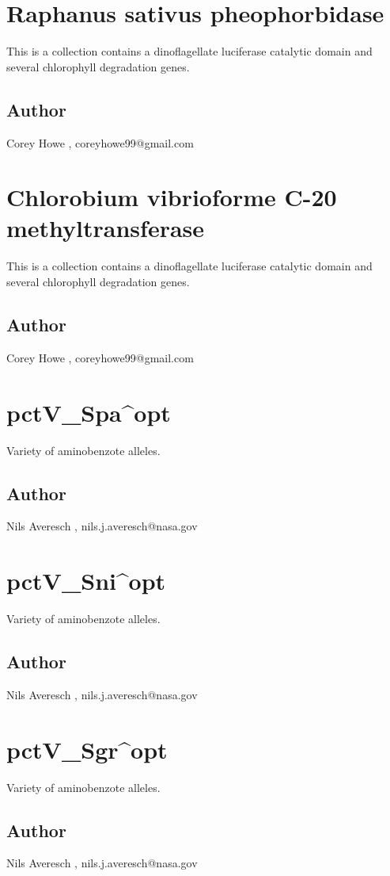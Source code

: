 \documentclass{article}%
\begin{document}
%
\section{Raphanus sativus pheophorbidase}%
This is a collection contains a dinoflagellate  luciferase catalytic domain and several chlorophyll degradation genes.%
\subsection{Author}%
Corey Howe%
,%
coreyhowe99@gmail.com

%
\section{Chlorobium vibrioforme C{-}20 methyltransferase}%
This is a collection contains a dinoflagellate  luciferase catalytic domain and several chlorophyll degradation genes.%
\subsection{Author}%
Corey Howe%
,%
coreyhowe99@gmail.com

%
\section{pctV\_Spa\^{}opt}%
Variety of aminobenzote alleles. %
\subsection{Author}%
Nils Averesch%
,%
nils.j.averesch@nasa.gov

%
\section{pctV\_Sni\^{}opt}%
Variety of aminobenzote alleles. %
\subsection{Author}%
Nils Averesch%
,%
nils.j.averesch@nasa.gov

%
\section{pctV\_Sgr\^{}opt}%
Variety of aminobenzote alleles. %
\subsection{Author}%
Nils Averesch%
,%
nils.j.averesch@nasa.gov
\end{document}

